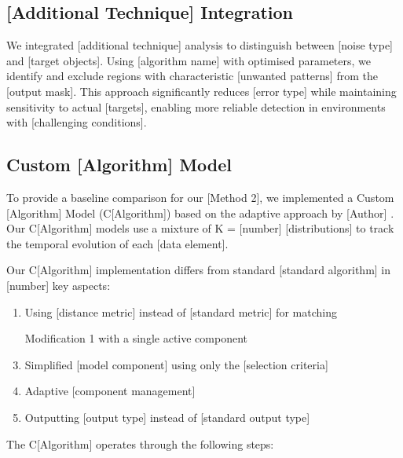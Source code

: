 \subsection{[Additional Technique] Integration}

We integrated [additional technique] analysis to distinguish between [noise type] and [target objects]. Using [algorithm name] \cite{sample2003reference} with optimised parameters, we identify and exclude regions with characteristic [unwanted patterns] from the [output mask]. This approach significantly reduces [error type] while maintaining sensitivity to actual [targets], enabling more reliable detection in environments with [challenging conditions].

\subsection{Custom [Algorithm] Model}

To provide a baseline comparison for our [Method 2], we implemented a Custom [Algorithm] Model (C[Algorithm]) based on the adaptive approach by [Author] \cite{sample2004reference, sample2006reference}. Our C[Algorithm] models use a mixture of K = [number] [distributions] to track the temporal evolution of each [data element].

Our C[Algorithm] implementation differs from standard [standard algorithm] in [number] key aspects:
\begin{enumerate}
\item Using [distance metric] instead of [standard metric] for matching
\item [Modification 1] with a single active component
\item Simplified [model component] using only the [selection criteria]
\item Adaptive [component management]
\item Outputting [output type] instead of [standard output type]
\end{enumerate}

The C[Algorithm] operates through the following steps:

